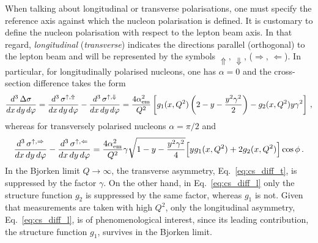When talking about longitudinal or transverse polarisations, one must specify the reference axis against which the nucleon polarisation is defined. It is customary to define the nucleon polarisation with respect to the lepton beam axis. In that regard, \textit{longitudinal} (\textit{transverse}) indicates the directions parallel (orthogonal) to the lepton beam and will be represented by the symbols $\Uparrow,\, \Downarrow$, ($\Rightarrow, \, \Leftarrow$). In particular, for longitudinally polarised nucleons, one has $\alpha=0$ and the cross-section difference takes the form
\begin{equation}
  \frac{d^3 \, \Delta \sigma}{dx \, dy \, d\varphi} = \frac{d^3 \, \sigma^{\uparrow, \Uparrow}}{dx \, dy \, d\varphi} - \frac{d^3 \, \sigma^{\uparrow, \Downarrow}}{dx \, dy \, d\varphi} = \frac{4 \alpha_{\textrm{em}}^2}{Q^2}  \left[ g_1(x,Q^2) \left( 2 - y - \frac{y^2 \gamma^2}{2} \right) - g_2(x,Q^2) y \gamma^2 \right] \,,
  \label{eq:cs_diff_l}
\end{equation}
whereas for transversely polarised nucleons $\alpha=\pi/2$ and
\begin{equation}
  \frac{d^3 \, \sigma^{\uparrow, \Rightarrow}}{dx \, dy \, d\varphi} - \frac{d^3 \, \sigma^{\uparrow, \Leftarrow}}{dx \, dy \, d\varphi} = \frac{4 \alpha_{\textrm{em}}^2}{Q^2} \gamma\sqrt{1 - y - \frac{y^2 \gamma^2}{4}}  \Bigl[ y g_1(x,Q^2) + 2 g_2(x,Q^2) \Bigr] \cos \phi\,.
  \label{eq:cs_diff_t}
\end{equation}
In the Bjorken limit $Q \rightarrow \infty$, the transverse asymmetry, Eq.~\eqref{eq:cs_diff_t}, is suppressed by the factor $\gamma$. On the other hand, in Eq.~\eqref{eq:cs_diff_l} only the structure function $g_2$ is suppressed by the same factor, whereas $g_1$ is not. Given that measurements are taken with high $Q^2$, only the longitudinal asymmetry, Eq.~\eqref{eq:cs_diff_l}, is of phenomenological interest, since its leading contribution, the structure function $g_1$, survives in the Bjorken limit.

